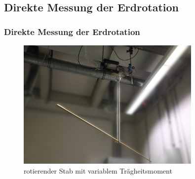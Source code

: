 \documentclass[10pt]{beamer}
\begin{document}
\subsection[]{Direkte Messung der Erdrotation}
\frame
{
\frametitle{Direkte Messung der Erdrotation}
\begin{figure}
\begin{center}
\includegraphics[width=0.8\textwidth]{./images/stab-gauss.jpg}
\caption{rotierender Stab mit variablem Tr\"agheitsmoment}
\end{center}
\end{figure}
}
\end{document}
